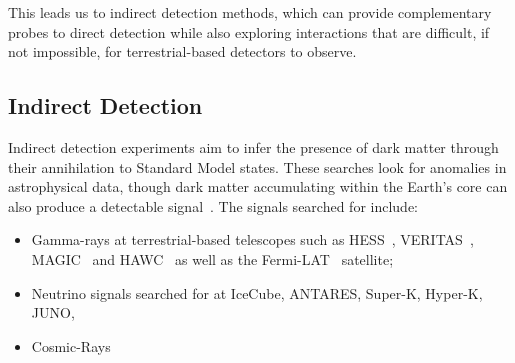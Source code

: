 This leads us to indirect detection methods, which can provide complementary probes to direct detection while also exploring interactions that are difficult, if not impossible, for terrestrial-based detectors to observe.
\subsection{Indirect Detection}

Indirect detection experiments aim to infer the presence of dark matter through their annihilation to Standard Model states. These searches look for anomalies in astrophysical data, though dark matter accumulating within the Earth's core can also produce a detectable signal~\cite{Lee:2013iua_jan_Constrainingdarkmatter, ANTARES:2016bxz_SearchDarkMatter}. The signals searched for include: 
\begin{itemize}
    \item Gamma-rays at terrestrial-based telescopes such as HESS~\cite{HESS:2018cbt_may_SearchgRayLine, Montanari:2023bzn_jul_Searchdarkmatter, HESS:2006zwn_ObservationsGalacticCenter}, VERITAS~\cite{VERITAS:2017tif_apr_DarkMatterConstraints, Ryan:2023yzu_jul_SearchDarkMatter, McGrath:2023oto_jul_IndirectsearchDark, McGrath:2023oto_IndirectsearchDarkMcGrath:2023btk_IndirectsearchDark, Ryan:2023yzu_jul_SearchDarkMatter}, MAGIC~\cite{MAGIC:2009tyk_MAGICGammaRayTelescope, MAGIC:2011nta_SearchesDarkMatter, MAGIC:2011nta_SearchesDarkMatter, MAGIC:2009tyk_MAGICGammaRayTelescope} and HAWC~\cite{HAWC:2017mfa_feb_DarkMatterLimits, HAWC:2017udy_feb_SearchDarkMatter, HAWC:2017udy_feb_SearchDarkMatter, HAWC:2017mfa_feb_DarkMatterLimits, Proper:2015xya_jul_FirstLimitsDark, Harding:2015bua_jul_DarkMatterAnnihilation} as well as the Fermi-LAT~\cite{Fermi-LAT:2015att_nov_SearchingDarkMatter, Fermi-LAT:2015att_nov_SearchingDarkMatterFermi-LAT:2015kyq_nov_SearchingDarkMatter, Fermi-LAT:2012ugx_FermiLATSearch, Fermi-LAT:2010qeq_ConstraintsCosmologicalDark, Fermi-LAT:2015att_nov_SearchingDarkMatterFermi-LAT:2015kyq_nov_SearchingDarkMatter, Fermi-LAT:2015att_nov_SearchingDarkMatter, Su:2010qj_GiantGammarayBubbles} satellite;
    \item Neutrino signals searched for at IceCube, ANTARES, Super-K, Hyper-K, JUNO, 
    \item Cosmic-Rays
\end{itemize}

